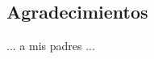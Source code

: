 \sloppy
\newpage
\thispagestyle{empty}

\begin{center}
\section*{Agradecimientos}
... a mis padres ...
\end{center}
